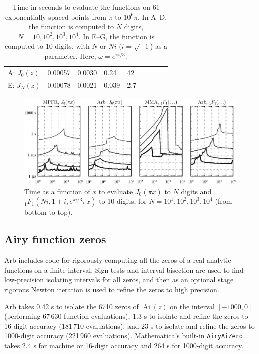 \documentclass[11pt]{article}
\begin{document}
\begin{table}
\begin{center}
\begin{scriptsize}
\begin{tabular}{l | l l l l | l l l l}
A: $J_0(z)$   & 0.00057  &  0.0030   &  0.24  &  42 & & & & \\
E: $J_N(z)$   & 0.00078  &  0.0021   &  0.039 &  2.7 & & & & \\
\end{tabular}
\end{scriptsize}
\caption{Time in seconds to evaluate the functions on 61 exponentially spaced points from $\pi$ to $10^6 \pi$.
In A--D, the function is computed to $N$ digits, $N = 10, 10^2, 10^3, 10^4$.
In E--G, the function is computed to 10 digits, with $N$ or $Ni$ ($i = \sqrt{-1}$) as a parameter. Here, $\omega = e^{\pi i / 3}$.}
\label{tab:ultrabenchmark}
\end{center}
\end{table}

\begin{figure}[!htb]
\centering
\includegraphics[scale=0.59]{timings.eps}
\caption{Time as a function of $x$ to evaluate $J_0(\pi x)$ to $N$ digits and ${}_1F_1(Ni,1+i,e^{\pi i / 3} \pi x)$ to 10 digits,
for $N = 10^1, 10^2, 10^3, 10^4$ (from bottom to top).}
\label{fig:timings}
\end{figure}

\subsection{Airy function zeros}

Arb includes code for rigorously computing
all the zeros of a real analytic functions on a finite interval.
Sign tests and interval bisection are used
to find low-precision isolating intervals for all zeros,
and then as an optional stage rigorous Newton iteration
is used to refine the zeros to high precision.

Arb takes 0.42 s to isolate the 6710 zeros of
$\operatorname{Ai}(z)$ on the interval $[-1000,0]$
(performing 67\,630 function evaluations),
1.3 s to isolate and refine the zeros to 16-digit accuracy (181\,710 evaluations),
and 23 s to isolate and refine the zeros to 1000-digit accuracy
(221\,960 evaluations).
Mathematica's built-in \texttt{AiryAiZero} takes 2.4 s for
machine or 16-digit accuracy and 264 s for 1000-digit accuracy.
\end{document}
